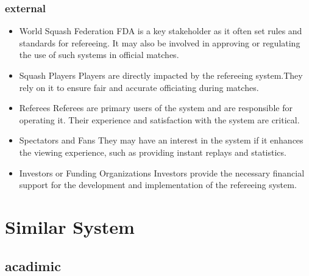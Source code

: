 \documentclass[12pt]{article}
\begin{document}
\subsubsection{external}

\begin{itemize}
 \item  World Squash Federation
 \newline
    FDA is a key stakeholder as it often set rules and standards for refereeing. It may also be involved in approving or regulating the use of such systems in official matches.
 \item Squash Players
  \newline
    Players are directly impacted by the refereeing system.They rely on it to ensure fair and accurate officiating during matches.
 \item Referees
  \newline
    Referees are primary users of the system and are responsible for operating it. Their experience and satisfaction with the system are critical.
 \item Spectators and Fans
  \newline
    They may have an interest in the system if it enhances the viewing experience, such as providing instant replays and statistics.
 \item Investors or Funding Organizations
  \newline
    Investors provide the necessary financial support for the development and implementation of the refereeing system.
\end{itemize}
\section{Similar System}
\subsection{acadimic}
\end{document}
